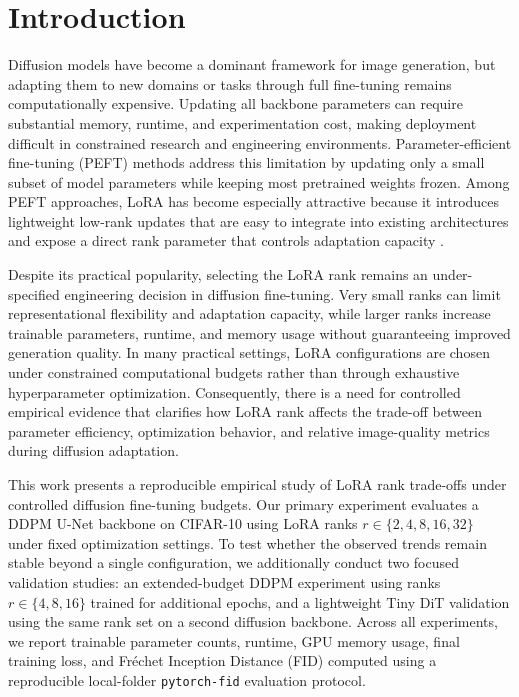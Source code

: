 \section{Introduction}

Diffusion models have become a dominant framework for image generation, but adapting them to new domains or tasks through full fine-tuning remains computationally expensive. Updating all backbone parameters can require substantial memory, runtime, and experimentation cost, making deployment difficult in constrained research and engineering environments. Parameter-efficient fine-tuning (PEFT) methods address this limitation by updating only a small subset of model parameters while keeping most pretrained weights frozen. Among PEFT approaches, LoRA has become especially attractive because it introduces lightweight low-rank updates that are easy to integrate into existing architectures and expose a direct rank parameter that controls adaptation capacity \cite{hu2022lora}.

Despite its practical popularity, selecting the LoRA rank remains an under-specified engineering decision in diffusion fine-tuning. Very small ranks can limit representational flexibility and adaptation capacity, while larger ranks increase trainable parameters, runtime, and memory usage without guaranteeing improved generation quality. In many practical settings, LoRA configurations are chosen under constrained computational budgets rather than through exhaustive hyperparameter optimization. Consequently, there is a need for controlled empirical evidence that clarifies how LoRA rank affects the trade-off between parameter efficiency, optimization behavior, and relative image-quality metrics during diffusion adaptation.

This work presents a reproducible empirical study of LoRA rank trade-offs under controlled diffusion fine-tuning budgets. Our primary experiment evaluates a DDPM U-Net backbone on CIFAR-10 using LoRA ranks $r \in \{2,4,8,16,32\}$ under fixed optimization settings. To test whether the observed trends remain stable beyond a single configuration, we additionally conduct two focused validation studies: an extended-budget DDPM experiment using ranks $r \in \{4,8,16\}$ trained for additional epochs, and a lightweight Tiny DiT validation using the same rank set on a second diffusion backbone. Across all experiments, we report trainable parameter counts, runtime, GPU memory usage, final training loss, and Fr\'echet Inception Distance (FID) computed using a reproducible local-folder \texttt{pytorch-fid} evaluation protocol.

